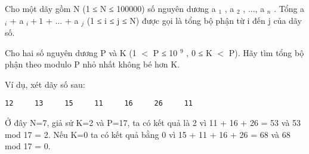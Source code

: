 Cho một dãy gồm N (1 ≤ N ≤ 100000) số nguyên dương a   $_    1   $   , a   $_    2   $   , ..., a   $_    n   $   . Tổng a   $_    i   $   + a   $_    i+1   $   + ... + a   $_    j   $   (1 ≤ i ≤ j ≤ N) được gọi là tổng bộ phận từ i đến j của dãy số.  

   Cho hai số nguyên dương P và K (1 $<$ P ≤ 10   $^    9   $   , 0 ≤ K $<$ P). Hãy tìm tổng bộ phận theo modulo P nhỏ nhất không bé hơn K.  

   Ví dụ, xét dãy số sau:  
\begin{verbatim}
12     13     15     11     16     26     11
\end{verbatim}

   Ở đây N=7, giả sử K=2 và P=17, ta có kết quả là 2 vì 11 + 16 + 26 = 53 và 53 mod 17 = 2. Nếu K=0 ta có kết quả bằng 0 vì 15 + 11 + 16 + 26 = 68 và 68 mod 17 = 0.